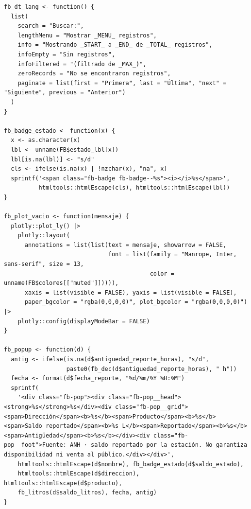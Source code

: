 \begin{lstlisting}[style=anexoR]
fb_dt_lang <- function() {
  list(
    search = "Buscar:",
    lengthMenu = "Mostrar _MENU_ registros",
    info = "Mostrando _START_ a _END_ de _TOTAL_ registros",
    infoEmpty = "Sin registros",
    infoFiltered = "(filtrado de _MAX_)",
    zeroRecords = "No se encontraron registros",
    paginate = list(first = "Primera", last = "Última", "next" = "Siguiente", previous = "Anterior")
  )
}

fb_badge_estado <- function(x) {
  x <- as.character(x)
  lbl <- unname(FB$estado_lbl[x])
  lbl[is.na(lbl)] <- "s/d"
  cls <- ifelse(is.na(x) | !nzchar(x), "na", x)
  sprintf('<span class="fb-badge fb-badge--%s"><i></i>%s</span>',
          htmltools::htmlEscape(cls), htmltools::htmlEscape(lbl))
}

fb_plot_vacio <- function(mensaje) {
  plotly::plot_ly() |>
    plotly::layout(
      annotations = list(list(text = mensaje, showarrow = FALSE,
                              font = list(family = "Manrope, Inter, sans-serif", size = 13,
                                          color = unname(FB$colores[["muted"]])))),
      xaxis = list(visible = FALSE), yaxis = list(visible = FALSE),
      paper_bgcolor = "rgba(0,0,0,0)", plot_bgcolor = "rgba(0,0,0,0)") |>
    plotly::config(displayModeBar = FALSE)
}

fb_popup <- function(d) {
  antig <- ifelse(is.na(d$antiguedad_reporte_horas), "s/d",
                  paste0(fb_dec(d$antiguedad_reporte_horas), " h"))
  fecha <- format(d$fecha_reporte, "%d/%m/%Y %H:%M")
  sprintf(
    '<div class="fb-pop"><div class="fb-pop__head"><strong>%s</strong>%s</div><div class="fb-pop__grid"><span>Dirección</span><b>%s</b><span>Producto</span><b>%s</b><span>Saldo reportado</span><b>%s L</b><span>Reportado</span><b>%s</b><span>Antigüedad</span><b>%s</b></div><div class="fb-pop__foot">Fuente: ANH · saldo reportado por la estación. No garantiza disponibilidad ni venta al público.</div></div>',
    htmltools::htmlEscape(d$nombre), fb_badge_estado(d$saldo_estado),
    htmltools::htmlEscape(d$direccion), htmltools::htmlEscape(d$producto),
    fb_litros(d$saldo_litros), fecha, antig)
}


\end{lstlisting}
